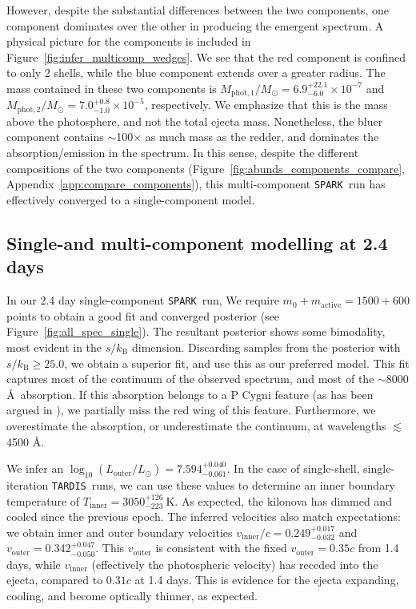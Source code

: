 \documentclass[twocolumn,twocolappendix]{aastex63}
\def\SPARK{\texttt{SPARK}}
\def\TARDIS{\texttt{TARDIS}}
\begin{document}
However, despite the substantial differences between the two components, one component dominates over the other in producing the emergent spectrum. A physical picture for the components is included in Figure~\ref{fig:infer_multicomp_wedges}. We see that the red component is confined to only 2 shells, while the blue component extends over a greater radius. The mass contained in these two components is $M_{\mathrm{phot},1}/M_{\odot} = 6.9^{+22.1}_{-6.0} \times 10^{-7}$ and $M_{\mathrm{phot},2}/M_{\odot} = 7.0^{+0.8}_{-1.0} \times 10^{-5}$, respectively. We emphasize that this is the mass above the photosphere, and not the total ejecta mass. Nonetheless, the bluer component contains $\sim$100$\times$ as much mass as the redder, and dominates the absorption/emission in the spectrum. In this sense, despite the different compositions of the two components (Figure~\ref{fig:abunds_components_compare}, Appendix~\ref{app:compare_components}), this multi-component \SPARK~run has effectively converged to a single-component model.




\subsection{Single-and multi-component modelling at 2.4 days}\label{ssc:2.4}

In our 2.4 day single-component \SPARK~run, We require $m_0 + m_{\mathrm{active}} = 1500 + 600$ points to obtain a good fit and converged posterior (see Figure~\ref{fig:all_spec_single}). The resultant posterior shows some bimodality, most evident in the $s/k_{\mathrm{B}}$ dimension. Discarding samples from the posterior with $s/k_{\mathrm{B}} \geqslant 25.0$, we obtain a superior fit, and use this as our preferred model. This fit captures most of the continuum of the observed spectrum, and most of the $\sim$8000 \AA~absorption. If this absorption belongs to a P Cygni feature (as has been argued in \citealt{watson19, sneppen23}), we partially miss the red wing of this feature. Furthermore, we overestimate the absorption, or underestimate the continuum, at wavelengths $\lesssim$4500 \AA. 

We infer an $\log_{10} (L_{\mathrm{outer}}/L_{\odot}) = 7.594^{+0.040}_{-0.061}$. In the case of single-shell, single-iteration \TARDIS~runs, we can use these values to determine an inner boundary temperature of $T_{\mathrm{inner}} = 3050^{+126}_{-223}~\mathrm{K}$. As expected, the kilonova has dimmed and cooled since the previous epoch. The inferred velocities also match expectations: we obtain inner and outer boundary velocities $v_{\mathrm{inner}}/c = 0.249^{+0.017}_{-0.032}$ and $v_{\mathrm{outer}} = 0.342^{+0.047}_{-0.050}$. This $v_{\mathrm{outer}}$ is consistent with the fixed $v_{\mathrm{outer}} = 0.35c$ from 1.4 days, while $v_{\mathrm{inner}}$ (effectively the photospheric velocity) has receded into the ejecta, compared to $0.31c$ at 1.4 days. This is evidence for the ejecta expanding, cooling, and become optically thinner, as expected.
\end{document}
